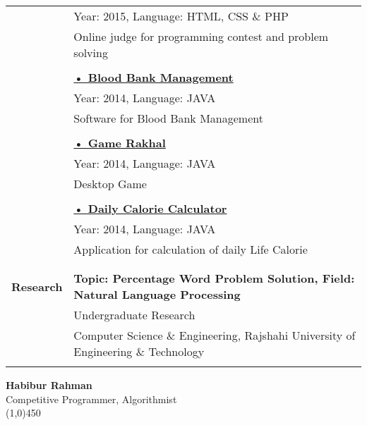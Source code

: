 \documentclass[letterpaper,11pt,oneside]{article}
\begin{document}
\begin{tabular}{@{} l l}
    & Year: 2015, Language: HTML, CSS \& PHP \\
    & \parbox{5.0in}{Online judge for programming contest and problem solving}\\
    & \\
    & \href{https://github.com/habibrahmanbd/nirob-blood-app/}{\textbf{• Blood Bank Management}}\\
    & Year: 2014, Language: JAVA \\
    & \parbox{5.0in}{Software for Blood Bank Management}\\
    & \\
    & \href{https://github.com/habibrahmanbd/Game-Rakhal-v1.0/}{\textbf{• Game Rakhal}}\\
    & Year: 2014, Language: JAVA \\
    & \parbox{5.0in}{Desktop Game}\\
    & \\
    & \href{https://github.com/habibrahmanbd/dailyCalorieCalculator}{\textbf{• Daily Calorie Calculator}}\\
    & Year: 2014, Language: JAVA \\
    & \parbox{5.0in}{Application for calculation of daily Life Calorie}\\
    \\
    \\
 \Large{\textbf{Research}}    & \textbf{Topic: Percentage Word Problem Solution, Field: Natural Language Processing} \\
     & Undergraduate Research \\
     & Computer Science \& Engineering, Rajshahi University of Engineering \& Technology\\
     \\
\end{tabular}
\newpage
\center  \LARGE{\textbf{Habibur Rahman}} \\ \small{Competitive Programmer, Algorithmist} \\
\vspace{-1ex}
{\line(1,0){450}}
\vspace{2em}
\noindent 
\end{document}
